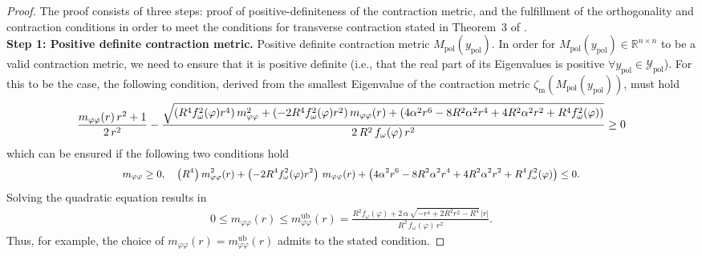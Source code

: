 \begin{proof} The proof consists of three steps: proof of positive-definiteness of the contraction metric, and the fulfillment of the orthogonality and contraction conditions in order to meet the conditions for transverse contraction stated in Theorem~3 of \citep{manchester2014transverse}.\\
    \textbf{Step 1: Positive definite contraction metric.} Positive definite contraction metric $M_\mathrm{pol}(y_\mathrm{pol})$. In order for $M_\mathrm{pol}(y_\mathrm{pol}) \in \mathbb{R}^{n \times n}$ to be a valid contraction metric, we need to ensure that it is positive definite (i.e., that the real part of its Eigenvalues is positive $\forall y_\mathrm{pol} \in \mathcal{Y}_\mathrm{pol}$). 
    For this to be the case, the following condition, derived from the smallest Eigenvalue of the contraction metric $\zeta_\mathrm{m}(M_\mathrm{pol}(y_\mathrm{pol}))$, must hold
    \begin{equation}\small
        \frac{m_{\varphi \varphi}(r) \, r^2 + 1}{2 \, r^2} - \frac{\sqrt{\left ( R^4 f_\omega^2(\varphi) r^4 \right ) m_{\varphi \varphi}^2 + \left ( -2 R^4 f_\omega^2(\varphi) r^2 \right ) m_{\varphi \varphi}(r) + \left ( 4 \alpha^2 r^6 - 8 R^2 \alpha^2 r^4 + 4 R^2 \alpha^2 r^2 + R^4 f_\omega^2(\varphi) \right )}}{2 \, R^2 \, f_\omega(\varphi) \, r^2} \geq 0
    \end{equation}
    which can be ensured if the following two conditions hold
    \begin{equation}\small
    \begin{split}
        m_{\varphi \varphi} \geq 0,
        \quad
        \left ( R^4 \right ) m_{\varphi \varphi}^2(r) + \left ( -2 R^4 f_\omega^2(\varphi) r^2 \right ) \, m_{\varphi \varphi}(r) + \left ( 4 \alpha^2 r^6 - 8 R^2 \alpha^2 r^4 + 4 R^2 \alpha^2 r^2 + R^4 f_\omega^2(\varphi) \right ) \leq 0.\\
    \end{split}
    \end{equation}
    Solving the quadratic equation results in
    \begin{equation}
    \begin{split}
        0 \leq m_{\varphi \varphi}(r) \leq m_{\varphi \varphi}^\mathrm{ub}(r) = \frac{R^2 f_\omega(\varphi) + 2 \, \alpha \, \sqrt{- r^4 + 2R^2 r^2 -R^4 } \, |r|}{R^2 \, f_\omega(\varphi) \, r^2}.
    \end{split}
    \end{equation}
    Thus, for example, the choice of $m_{\varphi \varphi}(r) = m_{\varphi \varphi}^\mathrm{ub}(r)$ admits to the stated condition.

\end{proof}
